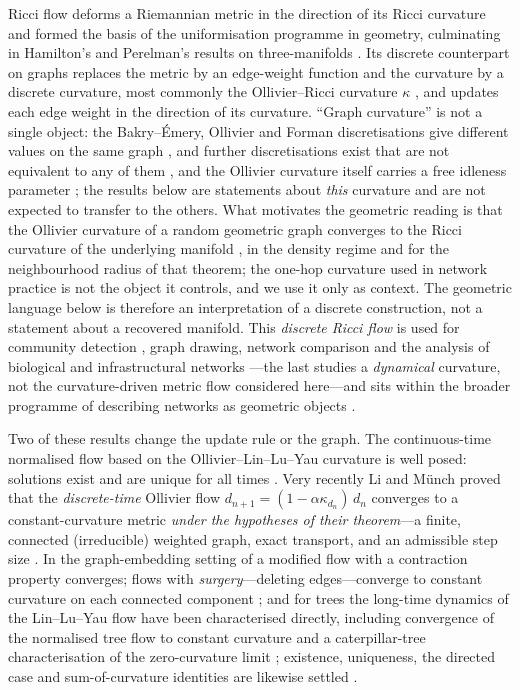 \documentclass[11pt]{article}
\newcommand{\kappaedge}{\kappa}
\begin{document}
Ricci flow deforms a Riemannian metric in the direction of its Ricci
curvature and formed the basis of the uniformisation programme in geometry,
culminating in Hamilton's and Perelman's results on three-manifolds
\cite{Hamilton1982,Perelman2002,Perelman2003}. Its discrete counterpart on
graphs replaces the metric by an edge-weight function and the curvature by a
discrete curvature, most commonly the Ollivier--Ricci curvature
$\kappaedge$ \cite{Ollivier2009,LinLuYau2011}, and updates each edge weight in
the direction of its curvature. ``Graph curvature'' is not a single object:
the {Bakry--\'Emery}, Ollivier and Forman discretisations give different
values on the same graph
\cite{LinYau2010,BauerChungLinLiu2017,Sreejith2016,Samal2018,Azarhooshang2020},
and further discretisations exist that are not equivalent to any of them
\cite{SaucanSamalJost2021,Forman2003}, and the Ollivier
curvature itself carries a free idleness parameter
\cite{LinLuYau2011,Bourne2018}; the results below are statements about
\emph{this} curvature and are not expected to transfer to the others. What motivates the geometric reading is that the Ollivier curvature of a
random geometric graph converges to the Ricci curvature of the underlying
manifold \cite{VanderHoorn2023}, in the density regime and for the
neighbourhood radius of that theorem; the one-hop curvature used in network
practice is not the object it controls, and we use it only as context. The
geometric language below is therefore an interpretation of a discrete
construction, not a statement about a recovered manifold. This \emph{discrete Ricci flow} is used for community detection
\cite{Ni2019,LaiBaiLin2022}, graph drawing, network comparison and the analysis
of biological and infrastructural networks
\cite{Sandhu2016,Samal2018,JostLiu2014,GosztolaiArnaudon2021}---the last studies a
\emph{dynamical} curvature, not the curvature-driven metric flow considered
here---and sits within the broader programme of describing networks
as geometric objects \cite{Krioukov2010,Boguna2021}.

Two of these results change the update rule or the graph. The continuous-time
normalised flow based on the Ollivier--Lin--Lu--Yau curvature is well posed:
solutions exist and are unique for all times \cite{BaiLinLuWangYau2024}. Very
recently Li and M\"unch proved that the \emph{discrete-time} Ollivier flow
$d_{n+1} = (1-\alpha\kappa_{d_n})\,d_n$ converges to a constant-curvature
metric \emph{under the hypotheses of their theorem}---a finite, connected
(irreducible) weighted graph, exact transport, and an admissible step
size \cite{LiMunch2026}. In the graph-embedding setting
of \cite{Naama2024} a modified flow with a contraction property converges;
flows with \emph{surgery}---deleting edges---converge to constant
curvature on each connected component \cite{MaYang2025}; and for trees the
long-time dynamics of the {Lin}--{Lu}--{Yau} flow have been characterised
directly, including convergence of the normalised tree flow to constant
curvature \cite{BaiLiuLai2026} and a caterpillar-tree characterisation of the
zero-curvature limit \cite{BaiHuaLinLiu2025}; existence, uniqueness, the
directed case and sum-of-curvature identities are likewise settled
\cite{BaiLinLuWangYau2024,BaiHuangLuYau2021,BaiLiLiuLai2025}.
\end{document}
